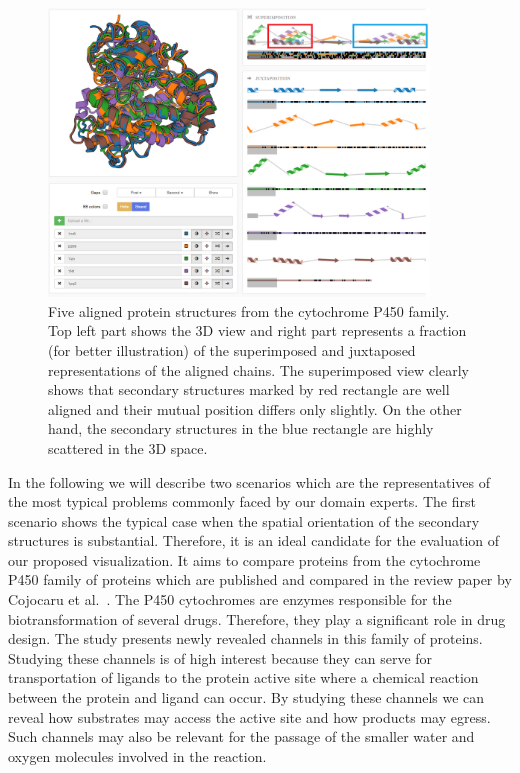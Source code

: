 \documentclass[twocolumn]{bmcart}%
\begin{document}
\begin{figure}[t!]
  \centering
  \includegraphics[width=0.9\textwidth]{pics/five.png}
  \caption{Five aligned protein structures from the cytochrome P450 family. Top left part shows the 3D view and right part represents a fraction (for better illustration) of the superimposed and juxtaposed representations of the aligned chains. The superimposed view clearly shows that secondary structures marked by red rectangle are well aligned and their mutual position differs only slightly. On the other hand, the secondary structures in the blue rectangle are highly scattered in the 3D space.}
  \label{fig:five}
\end{figure}


In the following we will describe two scenarios which are the representatives of the most typical problems commonly faced by our domain experts.
The first scenario shows the typical case when the spatial orientation of the secondary structures is substantial.
Therefore, it is an ideal candidate for the evaluation of our proposed visualization.
It aims to compare proteins from the cytochrome P450 family of proteins which are published and compared in the review paper by Cojocaru et al.~\cite{Cojocaru2007}. 
The P450 cytochromes are enzymes responsible for the biotransformation of several drugs.
Therefore, they play a significant role in drug design.
The study presents newly revealed channels in this family of proteins.
Studying these channels is of high interest because they can serve for transportation of ligands to the protein active site where a chemical reaction between the protein and ligand can occur.
By studying these channels we can reveal how substrates may access the active site and how products may egress. 
Such channels may also be relevant for the passage of the smaller water and oxygen molecules involved in the reaction. 
\end{document}
